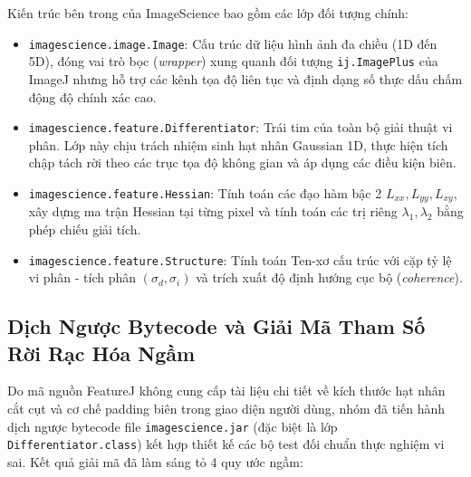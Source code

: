 \documentclass[conference]{IEEEtran}
\begin{document}
Kiến trúc bên trong của ImageScience bao gồm các lớp đối tượng chính:
\begin{itemize}
    \item \texttt{imagescience.image.Image}: Cấu trúc dữ liệu hình ảnh đa chiều (1D đến 5D), đóng vai trò bọc (\textit{wrapper}) xung quanh đối tượng \texttt{ij.ImagePlus} của ImageJ nhưng hỗ trợ các kênh tọa độ liên tục và định dạng số thực dấu chấm động độ chính xác cao.
    \item \texttt{imagescience.feature.Differentiator}: Trái tim của toàn bộ giải thuật vi phân. Lớp này chịu trách nhiệm sinh hạt nhân Gaussian 1D, thực hiện tích chập tách rời theo các trục tọa độ không gian và áp dụng các điều kiện biên.
    \item \texttt{imagescience.feature.Hessian}: Tính toán các đạo hàm bậc 2 $L_{xx}, L_{yy}, L_{xy}$, xây dựng ma trận Hessian tại từng pixel và tính toán các trị riêng $\lambda_1, \lambda_2$ bằng phép chiếu giải tích.
    \item \texttt{imagescience.feature.Structure}: Tính toán Ten-xơ cấu trúc với cặp tỷ lệ vi phân - tích phân $(\sigma_d, \sigma_i)$ và trích xuất độ định hướng cục bộ (\textit{coherence}).
\end{itemize}

\subsection{Dịch Ngược Bytecode và Giải Mã Tham Số Rời Rạc Hóa Ngầm}
Do mã nguồn FeatureJ không cung cấp tài liệu chi tiết về kích thước hạt nhân cắt cụt và cơ chế padding biên trong giao diện người dùng, nhóm đã tiến hành dịch ngược bytecode file \texttt{imagescience.jar} (đặc biệt là lớp \texttt{Differentiator.class}) kết hợp thiết kế các bộ test đối chuẩn thực nghiệm vi sai. Kết quả giải mã đã làm sáng tỏ 4 quy ước ngầm:
\end{document}
